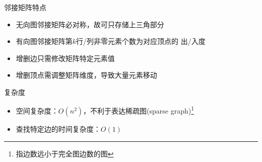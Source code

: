\begin{frame}
    \frametitle{\insertsectionhead}
    \begin{exampleblock}{邻接矩阵特点}
        \begin{itemize}
            \item 无向图邻接矩阵必\alert{对称}，故可只存储上三角部分
            \item 有向图邻接矩阵第$k$\alert{行/列}非零元素个数为对应顶点的
                  \alert{出/入度}
            \item 增删边只需修改矩阵特定元素值
            \item 增删顶点需调整矩阵\alert{维度}，导致大量元素移动
        \end{itemize}
    \end{exampleblock}
    \begin{exampleblock}{复杂度}
        \begin{itemize}
            \item 空间复杂度：$O(n^{2})$，不利于表达\alert{稀疏图(sparse
                      graph)\footnote{指边数远小于完全图边数的图}}
            \item 查找特定边的时间复杂度：$O(1)$
        \end{itemize}
    \end{exampleblock}
\end{frame}

